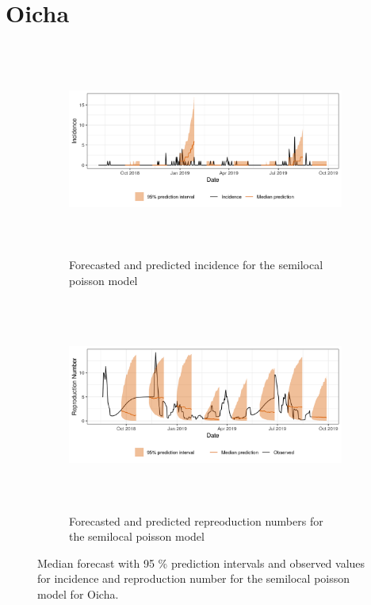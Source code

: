  \section{ Oicha }\begin{figure}[H]\begin{subfigure}{\textwidth}  \centering  \includegraphics[width=0.9\linewidth, height=7cm]{../output/Oicha_predictions.png}  \caption{Forecasted and predicted incidence for the semilocal poisson model}\end{subfigure}

\begin{subfigure}{\textwidth}  \centering  \includegraphics[width=0.9\linewidth, height=7cm]{../output/Oicha_Rs.png}  \caption{Forecasted and predicted repreoduction numbers for the semilocal poisson model}\end{subfigure}  \caption{Median forecast with 95 \% prediction intervals and observed values for incidence and reproduction number for the semilocal poisson model for Oicha.}\end{figure}


